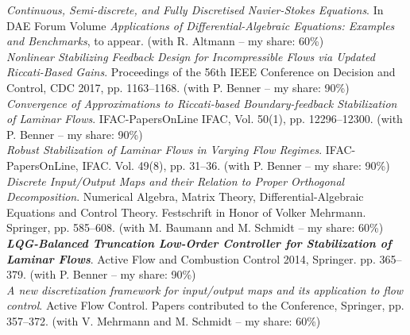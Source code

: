  \emph{Continuous, Semi-discrete, and Fully Discretised Navier-Stokes Equations}. In DAE Forum Volume \emph{Applications of Differential-Algebraic Equations: Examples and Benchmarks}, to appear. (with R. Altmann -- my share: 60\%) \\

 \emph{Nonlinear Stabilizing Feedback Design for Incompressible Flows via Updated Riccati-Based Gains}. Proceedings of the 56th IEEE Conference on Decision and Control, CDC 2017, pp. 1163--1168. (with P. Benner -- my share: 90\%) \\ 

 {\emph{Convergence of Approximations to Riccati-based Boundary-feedback Stabilization of Laminar Flows}. IFAC-PapersOnLine IFAC, Vol. 50(1), pp. 12296--12300.} (with P. Benner -- my share: 90\%)\\

 \emph{Robust Stabilization of Laminar Flows in Varying Flow Regimes}. IFAC-PapersOnLine, IFAC. Vol. 49(8), pp. 31--36. (with P. Benner -- my share: 90\%)\\

 \emph{Discrete Input/Output Maps and their Relation to Proper Orthogonal Decomposition}. Numerical Algebra, Matrix Theory, Differential-Algebraic Equations and Control Theory. Festschrift in Honor of Volker Mehrmann. Springer, pp. 585--608. (with M. Baumann and M. Schmidt -- my share: 60\%) \\

 {\textbf{\emph{LQG-Balanced Truncation Low-Order Controller for Stabilization of Laminar Flows}}. Active Flow and Combustion Control 2014, Springer. pp. 365--379.} (with P. Benner -- my share: 90\%) \\

 \emph{A new discretization framework for input/output maps and its application to flow control}. Active Flow Control. Papers contributed to the Conference, Springer, pp. 357--372. (with V. Mehrmann and M. Schmidt -- my share: 60\%) 


